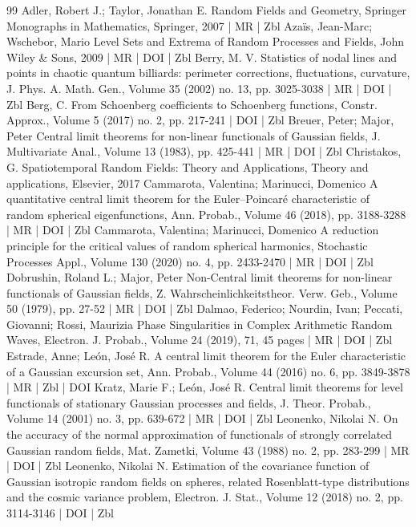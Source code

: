 \begin{thebibliography}{99}
 Adler, Robert J.; Taylor, Jonathan E. Random Fields and Geometry, Springer Monographs in Mathematics, Springer, 2007 | MR | Zbl
 Azaïs, Jean-Marc; Wschebor, Mario Level Sets and Extrema of Random Processes and Fields, John Wiley \& Sons, 2009 | MR | DOI | Zbl
 Berry, M. V. Statistics of nodal lines and points in chaotic quantum billiards: perimeter corrections, fluctuations, curvature, J. Phys. A. Math. Gen., Volume 35 (2002) no. 13, pp. 3025-3038 | MR | DOI | Zbl
 Berg, C. From Schoenberg coefficients to Schoenberg functions, Constr. Approx., Volume 5 (2017) no. 2, pp. 217-241 | DOI | Zbl
 Breuer, Peter; Major, Peter Central limit theorems for non-linear functionals of Gaussian fields, J. Multivariate Anal., Volume 13 (1983), pp. 425-441 | MR | DOI | Zbl
 Christakos, G. Spatiotemporal Random Fields: Theory and Applications, Theory and applications, Elsevier, 2017
 Cammarota, Valentina; Marinucci, Domenico A quantitative central limit theorem for the Euler–Poincaré characteristic of random spherical eigenfunctions, Ann. Probab., Volume 46 (2018), pp. 3188-3288 | MR | DOI | Zbl
 Cammarota, Valentina; Marinucci, Domenico A reduction principle for the critical values of random spherical harmonics, Stochastic Processes Appl., Volume 130 (2020) no. 4, pp. 2433-2470 | MR | DOI | Zbl
 Dobrushin, Roland L.; Major, Peter Non-Central limit theorems for non-linear functionals of Gaussian fields, Z. Wahrscheinlichkeitstheor. Verw. Geb., Volume 50 (1979), pp. 27-52 | MR | DOI | Zbl
 Dalmao, Federico; Nourdin, Ivan; Peccati, Giovanni; Rossi, Maurizia Phase Singularities in Complex Arithmetic Random Waves, Electron. J. Probab., Volume 24 (2019), 71, 45 pages | MR | DOI | Zbl
 Estrade, Anne; León, José R. A central limit theorem for the Euler characteristic of a Gaussian excursion set, Ann. Probab., Volume 44 (2016) no. 6, pp. 3849-3878 | MR | Zbl | DOI
 Kratz, Marie F.; León, José R. Central limit theorems for level functionals of stationary Gaussian processes and fields, J. Theor. Probab., Volume 14 (2001) no. 3, pp. 639-672 | MR | DOI | Zbl
 Leonenko, Nikolai N. On the accuracy of the normal approximation of functionals of strongly correlated Gaussian random fields, Mat. Zametki, Volume 43 (1988) no. 2, pp. 283-299 | MR | DOI | Zbl
 Leonenko, Nikolai N. Estimation of the covariance function of Gaussian isotropic random fields on spheres, related Rosenblatt-type distributions and the cosmic variance problem, Electron. J. Stat., Volume 12 (2018) no. 2, pp. 3114-3146 | DOI | Zbl

\end{thebibliography}
